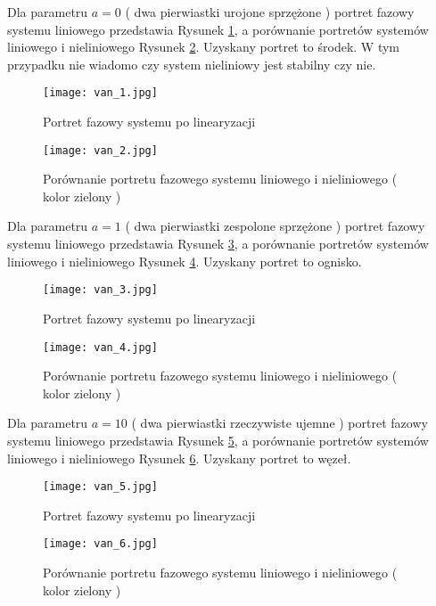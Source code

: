 \documentclass[a4paper,11pt]{article}
\begin{document}
Dla parametru \(a=0\) ( dwa pierwiastki urojone sprzężone ) portret fazowy systemu liniowego przedstawia Rysunek \ref{fig:van_1}, a porównanie portretów systemów liniowego i nieliniowego Rysunek \ref{fig:van_2}. Uzyskany portret to środek. W tym przypadku nie wiadomo czy system nieliniowy jest stabilny czy nie.
\begin{figure}[H]
\centerline{\texttt{[image: van\_1.jpg]}}
\centering
\caption{Portret fazowy systemu po linearyzacji}
\label{fig:van_1}
\end{figure}
\begin{figure}[H]
\centerline{\texttt{[image: van\_2.jpg]}}
\caption{Porównanie portretu fazowego systemu liniowego i nieliniowego ( kolor zielony )}
\label{fig:van_2}
\end{figure}
Dla parametru \(a=1\) ( dwa pierwiastki zespolone sprzężone ) portret fazowy systemu liniowego przedstawia Rysunek \ref{fig:van_3}, a porównanie portretów systemów liniowego i nieliniowego Rysunek \ref{fig:van_4}. Uzyskany portret to ognisko.
\begin{figure}[H]
\centerline{\texttt{[image: van\_3.jpg]}}
\centering
\caption{Portret fazowy systemu po linearyzacji}
\label{fig:van_3}
\end{figure}
\begin{figure}[H]
\centerline{\texttt{[image: van\_4.jpg]}}
\caption{Porównanie portretu fazowego systemu liniowego i nieliniowego ( kolor zielony )}
\label{fig:van_4}
\end{figure}
Dla parametru \(a=10\) ( dwa pierwiastki rzeczywiste ujemne ) portret fazowy systemu liniowego przedstawia Rysunek \ref{fig:van_5}, a porównanie portretów systemów liniowego i nieliniowego Rysunek \ref{fig:van_6}. Uzyskany portret to węzeł.
\begin{figure}[H]
\centerline{\texttt{[image: van\_5.jpg]}}
\centering
\caption{Portret fazowy systemu po linearyzacji}
\label{fig:van_5}
\end{figure}
\begin{figure}[H]
\centerline{\texttt{[image: van\_6.jpg]}}
\caption{Porównanie portretu fazowego systemu liniowego i nieliniowego ( kolor zielony )}
\label{fig:van_6}
\end{figure}
\end{document}
